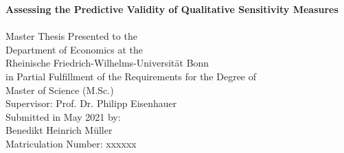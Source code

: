 \begin{titlepage}

    \begin{center}

    \vspace*{1.0cm}

    {\LARGE
    \bfseries Assessing the Predictive Validity of Qualitative Sensitivity Measures \\
    \vspace*{0.5cm}
    }
    \\


    {\large
    \vspace*{4.0cm}
    Master Thesis Presented to the\\
    \vspace*{0.25cm}
    Department of Economics at the\\
    \vspace*{0.25cm}
    Rheinische Friedrich-Wilhelms-Universität Bonn\\

    \vspace*{2.0cm}
    in Partial Fulfillment of the Requirements for the Degree of\\
    \vspace*{0.25cm}
    Master of Science (M.Sc.)\\

    \vspace*{4.0cm}
    Supervisor: Prof. Dr. Philipp Eisenhauer\\

    \vspace*{2.0cm}
    Submitted in May 2021 by:\\
    Benedikt Heinrich Müller\\
    Matriculation Number: xxxxxx
    }

    \end{center}

    \end{titlepage}
